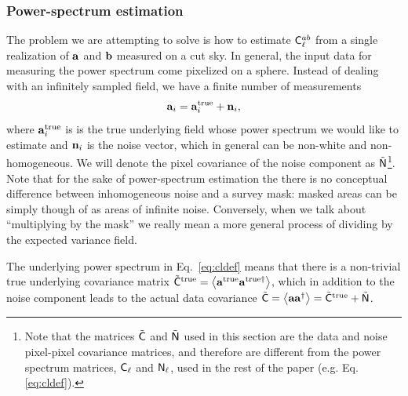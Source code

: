 \documentclass[usenatbib]{mnrasb}
\newcommand{\va}{{\mathbf{a}}}
\begin{document}
      \subsubsection{Power-spectrum estimation}
        The problem we are attempting to solve is how to estimate ${\sf C}^{ab}_\ell$ from a single realization of ${\bf a}$ and ${\bf b}$ measured on a cut sky. In general, the input data for measuring the power spectrum come pixelized on a sphere. Instead of dealing with an infinitely sampled field, we have a finite number of measurements
        \begin{equation}
          \va_i = \va_i^{\rm true} + {\bf n}_i,
        \end{equation}
        where $\va_i^{\rm true}$ is is the true underlying field whose power spectrum we would like to estimate and ${\bf n}_i$ is the noise vector, which in general can be non-white and non-homogeneous. We will denote the pixel covariance of the noise component as $\tilde{\sf N}$\footnote{Note that the matrices $\tilde{\sf C}$ and $\tilde{\sf N}$ used in this section are the data and noise pixel-pixel covariance matrices, and therefore are different from the power spectrum matrices, ${\sf C}_\ell$ and ${\sf N}_\ell$, used in the rest of the paper (e.g. Eq. \ref{eq:cldef}).}. Note that for the sake of power-spectrum estimation the there is no conceptual difference between inhomogeneous noise and a survey mask: masked areas can be simply though of as areas of infinite noise. Conversely, when we talk about ``multiplying by the mask'' we really mean a more general process of dividing by the expected variance field.

        The underlying power spectrum in Eq.~\ref{eq:cldef} means that there is a non-trivial true underlying covariance matrix $\tilde{\sf C}^{\rm true} = \left<\va^{\rm true} \va^{{\rm true}\dagger}\right>$, which in addition to the noise component leads to the actual data covariance $\tilde{\sf C} = \left<\va \va^\dagger\right>=\tilde{\sf C}^{\rm true} + \tilde{\sf N}$.
\end{document}
